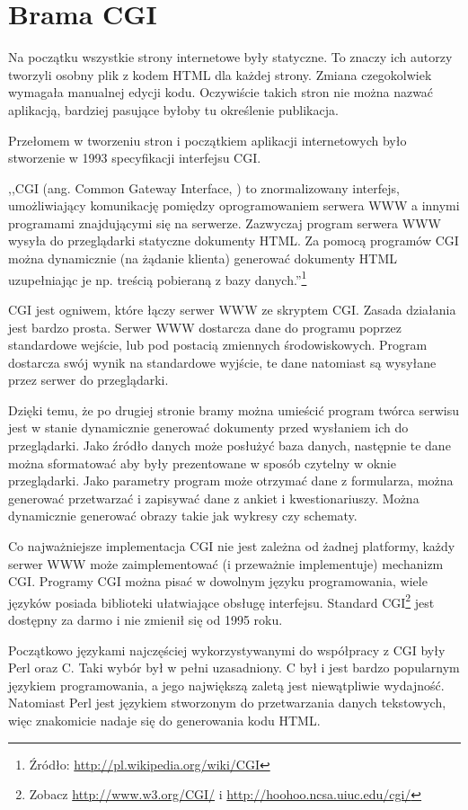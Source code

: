 \documentclass[a4paper,12pt,oneside]{report}
\begin{document}
\section{Brama CGI}
\label{sec:cgi}
Na początku wszystkie strony internetowe były statyczne. To znaczy ich autorzy tworzyli osobny plik z kodem HTML dla każdej strony. Zmiana czegokolwiek wymagała manualnej edycji kodu. Oczywiście takich stron nie można nazwać aplikacją, bardziej pasujące byłoby tu określenie publikacja.

Przełomem w tworzeniu stron i początkiem aplikacji internetowych było stworzenie w 1993 specyfikacji interfejsu CGI.

,,CGI (ang. Common Gateway Interface, ) to znormalizowany interfejs, umożliwiający komunikację pomiędzy oprogramowaniem serwera WWW a innymi programami znajdującymi się na serwerze. Zazwyczaj program serwera WWW wysyła do przeglądarki statyczne dokumenty HTML. Za pomocą programów CGI można dynamicznie (na żądanie klienta) generować dokumenty HTML uzupełniając je np. treścią pobieraną z bazy danych.''\footnote{Źródło: \url{http://pl.wikipedia.org/wiki/CGI}}

CGI jest ogniwem, które łączy serwer WWW ze skryptem CGI. Zasada działania jest bardzo prosta. Serwer WWW dostarcza dane do programu poprzez standardowe wejście, lub pod postacią zmiennych środowiskowych. Program dostarcza swój wynik na standardowe wyjście, te dane natomiast są wysyłane przez serwer do przeglądarki. 

Dzięki temu, że po drugiej stronie bramy można umieścić program twórca serwisu jest w stanie dynamicznie generować dokumenty przed wysłaniem ich do przeglądarki. Jako źródło danych  może posłużyć baza danych, następnie te dane można sformatować aby były prezentowane w sposób czytelny w oknie przeglądarki. Jako parametry program może otrzymać dane z formularza, można generować przetwarzać i zapisywać dane z ankiet i kwestionariuszy. Można dynamicznie generować obrazy takie jak wykresy czy schematy.

Co najważniejsze implementacja CGI nie jest zależna od żadnej platformy, każdy serwer WWW może zaimplementować (i przeważnie implementuje) mechanizm CGI. Programy CGI można pisać w dowolnym języku programowania, wiele języków posiada biblioteki ułatwiające obsługę interfejsu. Standard CGI\footnote{Zobacz \url{http://www.w3.org/CGI/} i \url{http://hoohoo.ncsa.uiuc.edu/cgi/}} jest dostępny za darmo i nie zmienił się od 1995 roku. 

Początkowo językami najczęściej wykorzystywanymi do współpracy z CGI były Perl oraz C. Taki wybór był w pełni uzasadniony. C był i jest bardzo popularnym językiem programowania, a jego największą zaletą jest niewątpliwie wydajność. Natomiast Perl jest językiem stworzonym do przetwarzania danych tekstowych, więc znakomicie nadaje się do generowania kodu HTML.
\end{document}
